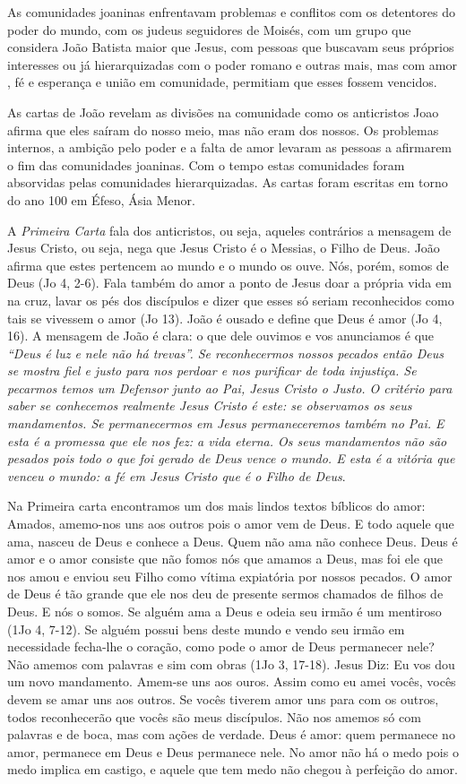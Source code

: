 \documentclass[
]{book}
\begin{document}
As comunidades joaninas enfrentavam problemas e conflitos com os detentores do poder do mundo, com os judeus seguidores de Moisés, com um grupo que considera João Batista maior que Jesus, com pessoas que buscavam seus próprios interesses ou já hierarquizadas com o poder romano e outras mais, mas com amor , fé e esperança e união em comunidade, permitiam que esses fossem vencidos.

As cartas de João revelam as divisões na comunidade como os anticristos Joao afirma que eles saíram do nosso meio, mas não eram dos nossos. Os problemas internos, a ambição pelo poder e a falta de amor levaram as pessoas a afirmarem o fim das comunidades joaninas. Com o tempo estas comunidades foram absorvidas pelas comunidades hierarquizadas. As cartas foram escritas em torno do ano 100 em Éfeso, Ásia Menor.

A \emph{Primeira Carta} fala dos anticristos, ou seja, aqueles contrários a mensagem de Jesus Cristo, ou seja, nega que Jesus Cristo é o Messias, o Filho de Deus. João afirma que estes pertencem ao mundo e o mundo os ouve. Nós, porém, somos de Deus (Jo 4, 2-6). Fala também do amor a ponto de Jesus doar a própria vida em na cruz, lavar os pés dos discípulos e dizer que esses só seriam reconhecidos como tais se vivessem o amor (Jo 13). João é ousado e define que Deus é amor (Jo 4, 16). A mensagem de João é clara: o que dele ouvimos e vos anunciamos é que \emph{``Deus é luz e nele não há trevas''. Se reconhecermos nossos pecados então Deus se mostra fiel e justo para nos perdoar e nos purificar de toda injustiça. Se pecarmos temos um Defensor junto ao Pai, Jesus Cristo o Justo. O critério para saber se conhecemos realmente Jesus Cristo é este: se observamos os seus mandamentos. Se permanecermos em Jesus permaneceremos também no Pai. E esta é a promessa que ele nos fez: a vida eterna. Os seus mandamentos não são pesados pois todo o que foi gerado de Deus vence o mundo. E esta é a vitória que venceu o mundo: a fé em Jesus Cristo que é o Filho de Deus}.

Na Primeira carta encontramos um dos mais lindos textos bíblicos do amor: Amados, amemo-nos uns aos outros pois o amor vem de Deus. E todo aquele que ama, nasceu de Deus e conhece a Deus. Quem não ama não conhece Deus. Deus é amor e o amor consiste que não fomos nós que amamos a Deus, mas foi ele que nos amou e enviou seu Filho como vítima expiatória por nossos pecados. O amor de Deus é tão grande que ele nos deu de presente sermos chamados de filhos de Deus. E nós o somos. Se alguém ama a Deus e odeia seu irmão é um mentiroso (1Jo 4, 7-12). Se alguém possui bens deste mundo e vendo seu irmão em necessidade fecha-lhe o coração, como pode o amor de Deus permanecer nele? Não amemos com palavras e sim com obras (1Jo 3, 17-18). Jesus Diz: Eu vos dou um novo mandamento. Amem-se uns aos ouros. Assim como eu amei vocês, vocês devem se amar uns aos outros. Se vocês tiverem amor uns para com os outros, todos reconhecerão que vocês são meus discípulos. Não nos amemos só com palavras e de boca, mas com ações de verdade. Deus é amor: quem permanece no amor, permanece em Deus e Deus permanece nele. No amor não há o medo pois o medo implica em castigo, e aquele que tem medo não chegou à perfeição do amor.
\end{document}

